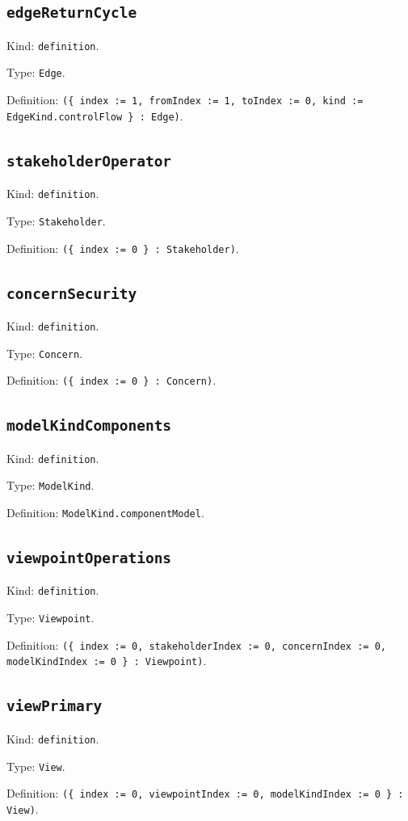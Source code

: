 \documentclass[11pt]{article}
\begin{document}
\subsection*{\texttt{edgeReturnCycle}}
\noindent Kind: \texttt{definition}.\par
\noindent Type: \texttt{Edge}.\par
\noindent Definition: \texttt{(\{ index := 1, fromIndex := 1, toIndex := 0, kind := EdgeKind.controlFlow \} : Edge)}.\par
\subsection*{\texttt{stakeholderOperator}}
\noindent Kind: \texttt{definition}.\par
\noindent Type: \texttt{Stakeholder}.\par
\noindent Definition: \texttt{(\{ index := 0 \} : Stakeholder)}.\par
\subsection*{\texttt{concernSecurity}}
\noindent Kind: \texttt{definition}.\par
\noindent Type: \texttt{Concern}.\par
\noindent Definition: \texttt{(\{ index := 0 \} : Concern)}.\par
\subsection*{\texttt{modelKindComponents}}
\noindent Kind: \texttt{definition}.\par
\noindent Type: \texttt{ModelKind}.\par
\noindent Definition: \texttt{ModelKind.componentModel}.\par
\subsection*{\texttt{viewpointOperations}}
\noindent Kind: \texttt{definition}.\par
\noindent Type: \texttt{Viewpoint}.\par
\noindent Definition: \texttt{(\{ index := 0, stakeholderIndex := 0, concernIndex := 0, modelKindIndex := 0 \} : Viewpoint)}.\par
\subsection*{\texttt{viewPrimary}}
\noindent Kind: \texttt{definition}.\par
\noindent Type: \texttt{View}.\par
\noindent Definition: \texttt{(\{ index := 0, viewpointIndex := 0, modelKindIndex := 0 \} : View)}.\par
\end{document}
